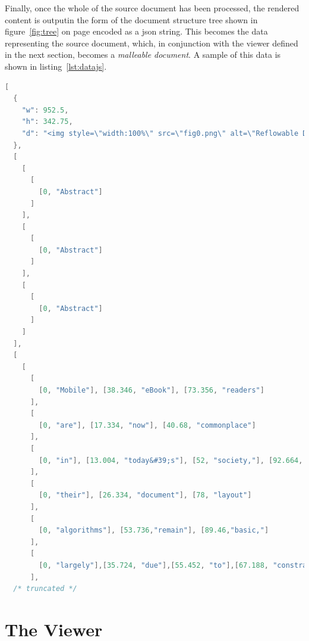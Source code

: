Finally, once the whole of the source document has been processed, the rendered content is output\ed in the form of the document structure tree shown in figure~\ref{fig:tree} on page \pageref{fig:tree}\ed encoded as a \gls{json} string. This becomes the data representing the source document, which, in conjunction with the viewer defined in the next section, becomes a \emph{malleable document}. A sample of this data is shown in listing~\ref{lst:datajs}.

\begin{lstlisting}[label=lst:datajs,captionpos=b,float,language=c,stringstyle=\color{blue},basicstyle=\ttfamily\footnotesize,caption={[Excerpt from JavaScript data file]Excerpt from JavaScript data file representing a 3-galley document. Note that the title "Abstract" is treated as any normal paragraph and, as for any paragraph, is typeset once for each galley rendering (despite there being no difference between each rendering in this case). The first rendering of the first paragraph of the abstract begins below. For brevity's sake, subsequent renderings are not shown, but since the following galleys are typeset with a different measure, the spacing and words per line will differ. At the top is an object representing a float, which contains values for \textcolor{red}width, \textcolor{red}height, and \textcolor{red}data.}]
[
  {
    "w": 952.5,
    "h": 342.75,
    "d": "<img style=\"width:100%\" src=\"fig0.png\" alt=\"Reflowable Documents Composed from\nPre-rendered Atomic Components\nAlexander J. Pinkney\nSteven R. Bagley\nDavid F. Brailsford\nDocument Engineering Lab.\nSchool of Computer Science\nUniversity of Nottingham\nNottingham, NG8 1BB, UK\n{azp|srb|dfb}@cs.nott.ac.uk\n\">"
  },
  [
    [
      [
        [0, "Abstract"]
      ]
    ],
    [
      [
        [0, "Abstract"]
      ]
    ],
    [
      [
        [0, "Abstract"]
      ]
    ]
  ],
  [
    [
      [
        [0, "Mobile"], [38.346, "eBook"], [73.356, "readers"]
      ],
      [
        [0, "are"], [17.334, "now"], [40.68, "commonplace"]
      ],
      [
        [0, "in"], [13.004, "today&#39;s"], [52, "society,"], [92.664, "but"]
      ],
      [
        [0, "their"], [26.334, "document"], [78, "layout"]
      ],
      [
        [0, "algorithms"], [53.736,"remain"], [89.46,"basic,"]
      ],
      [
        [0, "largely"],[35.724, "due"],[55.452, "to"],[67.188, "constraints"]
      ],
  /* truncated */

\end{lstlisting}


\section{The Viewer}
\label{sec:viewer}

